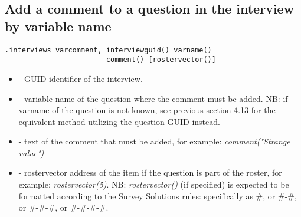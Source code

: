 \subsection{Add a comment to a question in the interview by variable name}
\begin{lstlisting}[style=CommandLineStyle]
.interviews_varcomment, interviewguid() varname()
                        comment() [rostervector()]
\end{lstlisting}
\optsheader
\begin{itemize}
    \item {} - GUID identifier of the interview.
    \item {} - variable name of the question where the
           comment must be added. NB: if varname of the question is not known,
           see previous section 4.13 for the equivalent method utilizing the
           question GUID instead.
    \item {} - text of the comment that must be added,
           for example: \textit{comment("Strange value")}
    \item {} - rostervector address of the item if the
           question is part of the roster, for example:
           \textit{rostervector(5)}. NB: \textit{rostervector()} (if specified)
           is expected to be formatted according to the Survey Solutions rules:
           specifically as \#, or \#-\#, or \#-\#-\#, or \#-\#-\#-\#.
\end{itemize}

